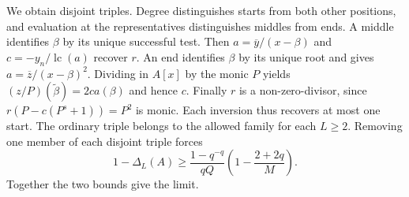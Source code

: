 We obtain disjoint triples. Degree distinguishes starts from both
other positions, and evaluation at the representatives distinguishes
middles from ends. A middle identifies $\beta$ by its unique
successful test. Then $a=\overline y/(x-\beta)$ and
$c=-y_n/\operatorname{lc}(a)$ recover $r$.
An end identifies $\beta$ by its unique root and gives
$a=\overline z/(x-\beta)^2$. Dividing in $A[x]$ by the monic $P$
yields $(z/P)(\widetilde\beta)=2c a(\beta)$ and hence $c$.
Finally $r$ is a non-zero-divisor, since
$r(P-c(P^s+1))=P^2$ is monic. Each inversion thus recovers at most one
start. The ordinary triple belongs to the allowed family for each $L\ge2$. Removing one member of each disjoint triple forces
\[
 1-\Delta_L(A)\ge
 \frac{1-q^{-q}}{qQ}
 \left(1-\frac{2+2q}{M}\right).
\]
Together the two bounds give the limit.
